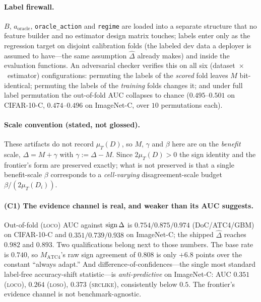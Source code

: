 \paragraph{Label firewall.} $B$, $a_{\text{oracle}}$, \texttt{oracle\_action} and \texttt{regime}
are loaded into a separate structure that no feature builder and no estimator design matrix
touches; labels enter only as the regression target on disjoint calibration folds (the labeled dev
data a deployer is assumed to have---the same assumption $\widehat\Delta$ already makes) and inside
the evaluation functions. An adversarial checker verifies this on all six
(dataset~$\times$~estimator) configurations: permuting the labels of the \emph{scored} fold leaves
$M$ bit-identical; permuting the labels of the \emph{training} folds changes it; and under full
label permutation the out-of-fold AUC collapses to chance ($0.495$--$0.501$ on CIFAR-10-C,
$0.474$--$0.496$ on ImageNet-C, over $10$ permutations each).

\paragraph{Scale convention (stated, not glossed).} These artifacts do not record $\mu_T(D)$, so
$M$, $\gamma$ and $\beta$ here are on the \emph{benefit} scale, $\Delta=M+\gamma$ with
$\gamma:=\Delta-M$. Since $2\mu_T(D)>0$ the sign identity and the frontier's form are preserved
exactly; what is not preserved is that a single benefit-scale $\beta$ corresponds to a
\emph{cell-varying} disagreement-scale budget $\beta/(2\mu_T(D_i))$.

\paragraph{(C1) The evidence channel is real, and weaker than its AUC suggests.} Out-of-fold
(\textsc{loco}) AUC against $\operatorname{sign}\Delta$ is $0.754/0.875/0.974$ (DoC/ATC4/GBM) on CIFAR-10-C and
$0.351/0.739/0.938$ on ImageNet-C; the shipped $\widehat\Delta$ reaches $0.982$ and $0.893$. Two
qualifications belong next to those numbers. The base rate is $0.740$, so $M_{\mathrm{ATC4}}$'s raw
sign agreement of $0.808$ is only $+6.8$ points over the constant ``always adapt.'' And
difference-of-confidences---the single most standard label-free accuracy-shift statistic---is
\emph{anti-predictive} on ImageNet-C: AUC $0.351$ (\textsc{loco}), $0.264$ (\textsc{loso}), $0.373$
(\textsc{srclike}), consistently below $0.5$. The frontier's evidence channel is not
benchmark-agnostic.

